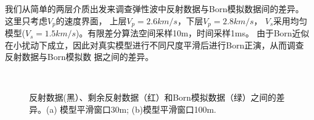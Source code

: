 我们从简单的两层介质出发来调查弹性波中反射数据与Born模拟数据间的差异。这里只考虑$V_p$的速度界面，
上层$V_p=2.6km/s$，下层$V_p=2.8km/s$， $V_s$采用均匀模型($V_s=1.5km/s$)。有限差分算法空间采样10m，时间采样1ms。
由于Born近似在小扰动下成立，因此对真实模型进行不同尺度平滑后进行Born正演，从而调查反射数据与Born模拟数
据之间的差异。
\begin{figure}[!htb]
   \centering
   \\
   \caption{反射数据(黑）、剩余反射数据（红）和Born模拟数据（绿）之间的差异。(a)
   模型平滑窗口30m; (b)模型平滑窗口100m.}
   \label{fig:refl_born_comparison}
\end{figure}

